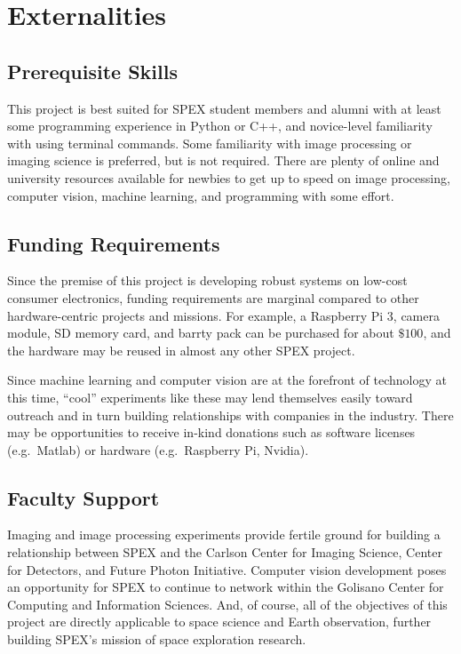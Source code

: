\documentclass[conference]{IEEEtran} %
\begin{document}
\section{Externalities}
\subsection{Prerequisite Skills}
 This project is best suited for SPEX student members and alumni with at least some programming experience in Python or C++, and novice-level familiarity with using terminal commands.
 Some familiarity with image processing or imaging science is preferred, but is not required.
 There are plenty of online and university resources available for newbies to get up to speed on image processing, computer vision, machine learning, and programming with some effort.

\subsection{Funding Requirements}
Since the premise of this project is developing robust systems on low-cost consumer electronics, funding requirements are marginal compared to other hardware-centric projects and missions.
For example, a Raspberry Pi 3, camera module, SD memory card, and barrty pack can be purchased for about $\$100$, and the hardware may be reused in almost any other SPEX project.

Since machine learning and computer vision are at the forefront of technology at this time, ``cool'' experiments like these may lend themselves easily toward outreach and in turn building relationships with companies in the industry.
There may be opportunities to receive in-kind donations such as software licenses (e.g.~Matlab) or hardware (e.g.~Raspberry Pi, Nvidia).

\subsection{Faculty Support}
Imaging and image processing experiments provide fertile ground for building a relationship between SPEX and the Carlson Center for Imaging Science, Center for Detectors, and Future Photon Initiative.
Computer vision development poses an opportunity for SPEX to continue to network within the Golisano Center for Computing and Information Sciences.
And, of course, all of the objectives of this project are directly applicable to space science and Earth observation, further building SPEX's mission of space exploration research.
\end{document}
